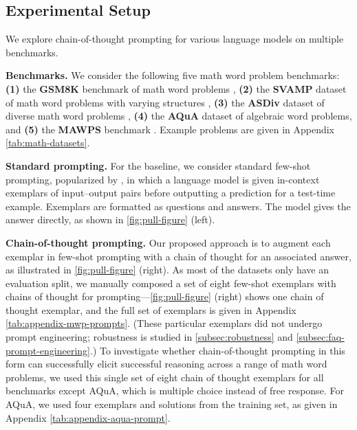 \subsection{Experimental Setup}

We explore chain-of-thought prompting for various language models on multiple benchmarks.

\textbf{Benchmarks.}
We consider the following five math word problem benchmarks:
\textbf{(1)} the \textbf{GSM8K} benchmark of math word problems \citep{cobbe2021training}, 
\textbf{(2)} the \textbf{SVAMP} dataset of math word problems with varying structures \citep{patel-etal-2021-nlp},
\textbf{(3)} the \textbf{ASDiv} dataset of diverse math word problems \citep{miao-etal-2020-diverse},
\textbf{(4)} the \textbf{AQuA} dataset of algebraic word problems, and
\textbf{(5)} the \textbf{MAWPS} benchmark \citep{koncel-kedziorski-etal-2016-mawps}. Example problems are given in Appendix \cref{tab:math-datasets}.

\textbf{Standard prompting.} For the baseline, we consider standard few-shot prompting, popularized by \citet{brown2020language}, in which a language model is given in-context exemplars of input--output pairs before outputting a prediction for a test-time example. Exemplars are formatted as questions and answers. The model gives the answer directly, as shown in \cref{fig:pull-figure} (left).

\textbf{Chain-of-thought prompting.} Our proposed approach is to augment each exemplar in few-shot prompting with a chain of thought for an associated answer, as illustrated in \cref{fig:pull-figure} (right). As most of the datasets only have an evaluation split, we manually composed a set of eight few-shot exemplars with chains of thought for prompting---\cref{fig:pull-figure} (right) shows one chain of thought exemplar, and the full set of exemplars is given in Appendix \cref{tab:appendix-mwp-prompts}. 
(These particular exemplars did not undergo prompt engineering; robustness is studied in \cref{subsec:robustness} and \cref{subsec:faq-prompt-engineering}.)
To investigate whether chain-of-thought prompting in this form can successfully elicit successful reasoning across a range of math word problems, we used this single set of eight chain of thought exemplars for all benchmarks except AQuA, which is multiple choice instead of free response. For AQuA, we used four exemplars and solutions from the training set, as given in Appendix \cref{tab:appendix-aqua-prompt}.

